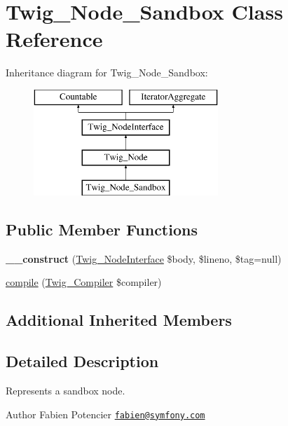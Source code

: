 \hypertarget{class_twig___node___sandbox}{}\section{Twig\+\_\+\+Node\+\_\+\+Sandbox Class Reference}
\label{class_twig___node___sandbox}
Inheritance diagram for Twig\+\_\+\+Node\+\_\+\+Sandbox\+:\begin{figure}[H]
\begin{center}
\leavevmode
\includegraphics[height=4.000000cm]{class_twig___node___sandbox}
\end{center}
\end{figure}
\subsection*{Public Member Functions}
\begin{DoxyCompactItemize}
\item 
\hypertarget{class_twig___node___sandbox_aa25d55f5106b7cf44145b8565ef8fbbc}{}{\bfseries \+\_\+\+\_\+construct} (\hyperlink{interface_twig___node_interface}{Twig\+\_\+\+Node\+Interface} \$body, \$lineno, \$tag=null)\label{class_twig___node___sandbox_aa25d55f5106b7cf44145b8565ef8fbbc}

\item 
\hyperlink{class_twig___node___sandbox_a4e0faa87c3fae583620b84d3607085da}{compile} (\hyperlink{class_twig___compiler}{Twig\+\_\+\+Compiler} \$compiler)
\end{DoxyCompactItemize}
\subsection*{Additional Inherited Members}


\subsection{Detailed Description}
Represents a sandbox node.

\begin{DoxyAuthor}{Author}
Fabien Potencier \href{mailto:fabien@symfony.com}{\tt fabien@symfony.\+com} 
\end{DoxyAuthor}


